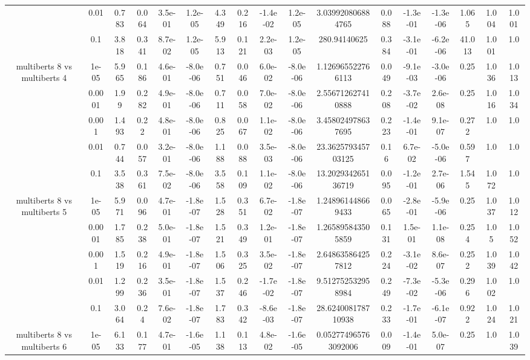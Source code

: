 \begin{tabular}{|c|c|c|c|c|c|c|c|c|c|c|c|c|c|c|c|c|}
 & 0.01 & 0.783 & 0.064 & 3.5e-01 & 1.2e-05 & 4.349 & 0.216 & -1.4e-02 & 1.2e-05 & 3.039920806884765 & 0.088 & -1.3e-01 & -1.3e-06 & 1.065 & 1.004 & 1.001 \\
 & 0.1 & 3.818 & 0.341 & 8.7e-02 & 1.2e-05 & 5.913 & 0.121 & 2.2e-03 & 1.2e-05 & 280.94140625 & 0.384 & -3.1e-01 & -6.2e-06 & 41.013 & 1.001 & 1.0 \\
\hline
\multirow{5}{*}{multiberts 8 vs multiberts 4} & 1e-05 & 5.965 & 0.186 & 4.6e-01 & -8.0e-06 & 0.751 & 0.046 & 6.0e-02 & -8.0e-06 & 1.126965522766113 & 0.049 & -9.1e-03 & -3.0e-06 & 0.25 & 1.036 & 1.013 \\
 & 0.0001 & 1.99 & 0.282 & 4.9e-01 & -8.0e-06 & 0.711 & 0.058 & 7.0e-02 & -8.0e-06 & 2.556712627410888 & 0.208 & -3.7e-02 & 2.6e-08 & 0.25 & 1.016 & 1.034 \\
 & 0.001 & 1.493 & 0.22 & 4.8e-01 & -8.0e-06 & 0.825 & 0.067 & 1.1e-02 & -8.0e-06 & 3.458024978637695 & 0.223 & -1.4e-01 & 9.1e-07 & 0.272 & 1.0 & 1.0 \\
 & 0.01 & 0.744 & 0.057 & 3.2e-01 & -8.0e-06 & 1.188 & 0.088 & 3.5e-03 & -8.0e-06 & 23.362579345703125 & 0.16 & 6.7e-02 & -5.0e-06 & 0.597 & 1.0 & 1.0 \\
 & 0.1 & 3.538 & 0.361 & 7.5e-02 & -8.0e-06 & 3.558 & 0.109 & 1.1e-02 & -8.0e-06 & 13.202934265136719 & 0.095 & -1.2e-01 & 2.7e-06 & 1.545 & 1.072 & 1.0 \\
\hline
\multirow{5}{*}{multiberts 8 vs multiberts 5} & 1e-05 & 5.971 & 0.096 & 4.7e-01 & -1.8e-07 & 1.528 & 0.351 & 6.7e-02 & -1.8e-07 & 1.248961448669433 & 0.065 & -2.8e-01 & -5.9e-06 & 0.25 & 1.037 & 1.012 \\
 & 0.0001 & 1.785 & 0.238 & 5.0e-01 & -1.8e-07 & 1.521 & 0.349 & 1.2e-01 & -1.8e-07 & 1.265895843505859 & 0.131 & 1.5e-01 & 1.1e-08 & 0.254 & 1.05 & 1.052 \\
 & 0.001 & 1.519 & 0.216 & 4.9e-01 & -1.8e-07 & 1.506 & 0.325 & 3.5e-02 & -1.8e-07 & 2.648635864257812 & 0.224 & -3.1e-02 & 8.6e-07 & 0.252 & 1.039 & 1.042 \\
 & 0.01 & 1.299 & 0.236 & 3.5e-01 & -1.8e-07 & 1.537 & 0.246 & -1.7e-02 & -1.8e-07 & 9.512752532958984 & 0.249 & -7.3e-02 & -5.3e-06 & 0.296 & 1.002 & 1.0 \\
 & 0.1 & 3.064 & 0.24 & 7.6e-02 & -1.8e-07 & 1.783 & 0.342 & -8.6e-03 & -1.8e-07 & 28.624008178710938 & 0.233 & -1.7e-01 & -6.1e-07 & 0.922 & 1.024 & 1.021 \\
\hline
\multirow{5}{*}{multiberts 8 vs multiberts 6} & 1e-05 & 6.133 & 0.177 & 4.7e-01 & -1.6e-05 & 1.138 & 0.113 & 4.8e-02 & -1.6e-05 & 0.052774965763092006 & 0.009 & -1.4e-01 & 5.0e-07 & 0.25 & 1.0 & 1.039 \\

\end{tabular}
